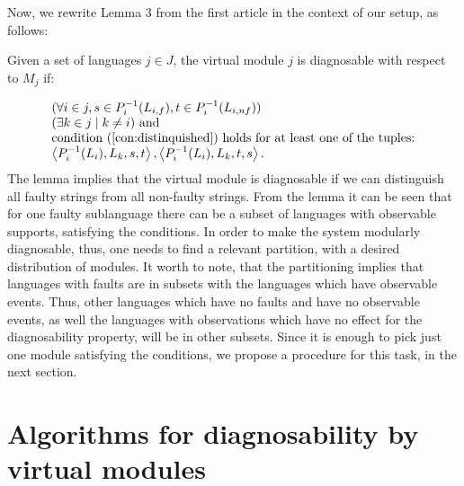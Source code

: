 \documentclass[a4paper, 10pt, conference]{ieeeconf}
\begin{document}
Now, we rewrite Lemma 3 from the first article in the context of our setup, as
follows:
\begin{lemma}
\label{lem:virtual_module_is_diagnosable}
Given a set of languages $j \in J$, the virtual module $j$ is diagnosable with
respect to $M_j$ if:
\end{lemma}
\begin{equation}
	\begin{array}{l}
		(\forall i \in j, 
			s \in P_i^{-1}(L_{i,f}), 
			t \in P_i^{-1}(L_{i,nf}))
		\\
		(\exists k \in j \mid k \neq i) \textrm{ and }
		\\
		\textrm{condition (\ref{con:distinquished}) holds for at least one of
		the tuples:}
		\\
		\left<P_i^{-1}(L_i), L_k, s, t \right>,
		\left<P_i^{-1}(L_i), L_k, t, s \right>.
	\end{array}
\end{equation}
The lemma implies that the virtual module is diagnosable if we can distinguish
all faulty strings from all non-faulty strings. 
From the lemma it can be seen that for one faulty sublanguage there can be a
subset of languages with observable supports, satisfying the conditions. In
order to make the system modularly diagnosable, thus, one needs to find a
relevant partition, with a desired distribution of modules. It worth to note,
that the partitioning implies that languages with faults are in subsets with the
languages which have observable events. Thus, other languages which have no
faults and have no observable events, as well the languages with observations
which have no effect for the diagnosability property, will be in other subsets.
Since it is enough to pick just one module satisfying the conditions, we
propose a procedure for this task, in the next section.



\section{Algorithms for diagnosability by virtual modules}
\label{sec:algorithms}
\end{document}
